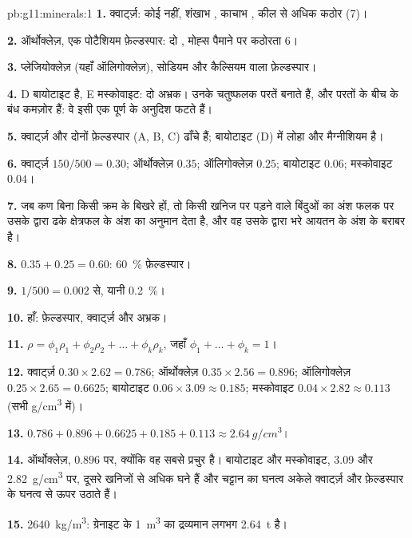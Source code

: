 \begin{solution}{pb:g11:minerals:1}
\textbf{1.} क्वार्ट्ज़: कोई  नहीं, शंखाभ , काचाभ , कील से
अधिक कठोर (7)।

\textbf{2.} ऑर्थोक्लेज़, एक पोटैशियम फ़ेल्डस्पार: दो , मोह्स पैमाने पर
कठोरता 6।

\textbf{3.} प्लेजियोक्लेज़ (यहाँ ऑलिगोक्लेज़), सोडियम और
कैल्सियम वाला फ़ेल्डस्पार।

\textbf{4.} D बायोटाइट है, E मस्कोवाइट: दो अभ्रक। उनके चतुष्फलक
परतें बनाते हैं, और परतों के बीच के बंध कमज़ोर हैं: वे इसी एक
पूर्ण  के अनुदिश फटते हैं।

\textbf{5.} क्वार्ट्ज़ और दोनों फ़ेल्डस्पार (A, B, C) ढाँचे हैं; बायोटाइट
(D) में लोहा और मैग्नीशियम है।

\textbf{6.} क्वार्ट्ज़ $150/500 = 0.30$; ऑर्थोक्लेज़ $0.35$; ऑलिगोक्लेज़ $0.25$;
बायोटाइट $0.06$; मस्कोवाइट $0.04$।

\textbf{7.} जब कण बिना किसी क्रम के बिखरे हों, तो किसी खनिज पर पड़ने वाले बिंदुओं का अंश
फलक पर उसके द्वारा ढके क्षेत्रफल के अंश का अनुमान देता है, और वह
उसके द्वारा भरे आयतन के अंश के बराबर है।

\textbf{8.} $0.35 + 0.25 = 0.60$: \qty{60}{\percent} फ़ेल्डस्पार।

\textbf{9.} $1/500 = 0.002$ से, यानी \qty{0.2}{\percent}।

\textbf{10.} हाँ: फ़ेल्डस्पार, क्वार्ट्ज़ और अभ्रक।

\textbf{11.} $\rho = \phi_1 \rho_1 + \phi_2 \rho_2 + \dots + \phi_k \rho_k$,
जहाँ $\phi_1 + \dots + \phi_k = 1$।

\textbf{12.} क्वार्ट्ज़ $0.30 \times 2.62 = 0.786$; ऑर्थोक्लेज़ $0.35 \times 2.56 =
0.896$; ऑलिगोक्लेज़ $0.25 \times 2.65 = 0.6625$; बायोटाइट $0.06 \times 3.09
\approx 0.185$; मस्कोवाइट $0.04 \times 2.82 \approx 0.113$ (सभी
\unit{g/cm^3} में)।

\textbf{13.} $0.786 + 0.896 + 0.6625 + 0.185 + 0.113 \approx
\qty{2.64}{g/cm^3}$।

\textbf{14.} ऑर्थोक्लेज़, $0.896$ पर, क्योंकि वह सबसे प्रचुर है। बायोटाइट
और मस्कोवाइट, \qty{3.09}{} और \qty{2.82}{g/cm^3} पर, दूसरे खनिजों से
अधिक घने हैं और चट्टान का घनत्व अकेले क्वार्ट्ज़ और फ़ेल्डस्पार के घनत्व से
ऊपर उठाते हैं।

\textbf{15.} \qty{2640}{kg/m^3}: ग्रेनाइट के \qty{1}{m^3} का द्रव्यमान
लगभग \qty{2.64}{t} है।


\end{solution}
